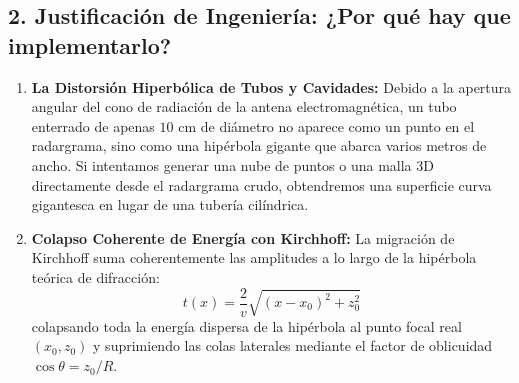 \documentclass[11pt,a4paper]{article}
\begin{document}
\subsection{2. Justificación de Ingeniería: ¿Por qué hay que implementarlo?}
\begin{enumerate}
    \item \textbf{La Distorsión Hiperbólica de Tubos y Cavidades:}
    Debido a la apertura angular del cono de radiación de la antena electromagnética, un tubo enterrado de apenas $10\text{ cm}$ de diámetro no aparece como un punto en el radargrama, sino como una hipérbola gigante que abarca varios metros de ancho. Si intentamos generar una nube de puntos o una malla 3D directamente desde el radargrama crudo, obtendremos una superficie curva gigantesca en lugar de una tubería cilíndrica.
    \item \textbf{Colapso Coherente de Energía con Kirchhoff:}
    La migración de Kirchhoff suma coherentemente las amplitudes a lo largo de la hipérbola teórica de difracción:
    \begin{equation}
        t(x) = \frac{2}{v} \sqrt{(x - x_0)^2 + z_0^2}
    \end{equation}
    colapsando toda la energía dispersa de la hipérbola al punto focal real $(x_0, z_0)$ y suprimiendo las colas laterales mediante el factor de oblicuidad $\cos\theta = z_0/R$.
\end{enumerate}
\end{document}
